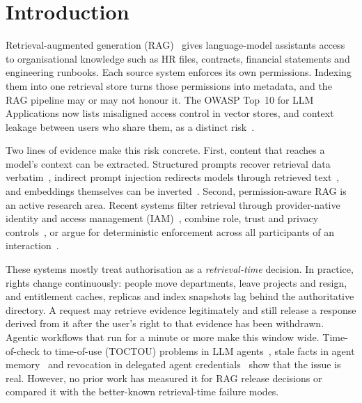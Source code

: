 \documentclass[10pt]{article}
\begin{document}
\section{Introduction}
Retrieval-augmented generation (RAG)~\cite{lewis2020rag} gives language-model assistants access to organisational knowledge such as HR files, contracts, financial statements and engineering runbooks. Each source system enforces its own permissions. Indexing them into one retrieval store turns those permissions into metadata, and the RAG pipeline may or may not honour it. The OWASP Top~10 for LLM Applications now lists misaligned access control in vector stores, and context leakage between users who share them, as a distinct risk~\cite{owasp2025}.

Two lines of evidence make this risk concrete. First, content that reaches a model's context can be extracted. Structured prompts recover retrieval data verbatim~\cite{zeng2024good,qi2024spill}, indirect prompt injection redirects models through retrieved text~\cite{greshake2023}, and embeddings themselves can be inverted~\cite{morris2023}. Second, permission-aware RAG is an active research area. Recent systems filter retrieval through provider-native identity and access management (IAM)~\cite{jeong2025permission}, combine role, trust and privacy controls~\cite{saxena2026pppa}, or argue for deterministic enforcement across all participants of an interaction~\cite{bhatt2025participant}.

These systems mostly treat authorisation as a \emph{retrieval-time} decision. In practice, rights change continuously: people move departments, leave projects and resign, and entitlement caches, replicas and index snapshots lag behind the authoritative directory. A request may retrieve evidence legitimately and still release a response derived from it after the user's right to that evidence has been withdrawn. Agentic workflows that run for a minute or more make this window wide. Time-of-check to time-of-use (TOCTOU) problems in LLM agents~\cite{lilienthal2025toctou}, stale facts in agent memory~\cite{shen2026revoked} and revocation in delegated agent credentials~\cite{parakhin2026} show that the issue is real. However, no prior work has measured it for RAG release decisions or compared it with the better-known retrieval-time failure modes.
\end{document}
